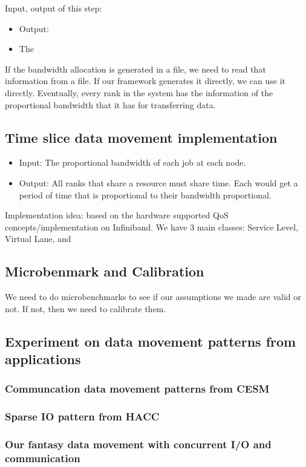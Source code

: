 \documentclass[letter]{article}
\begin{document}
Input, output of this step:
\begin{itemize}
\item Output:
\item The
\end{itemize}

If the bandwidth allocation is generated in a file, we need to read that information from a file. If our framework generates it directly, we can use it directly. Eventually, every rank in the system has the information of the proportional bandwidth that it has for transferring data.

\subsection{Time slice data movement implementation}
\begin{itemize}
\item Input: The proportional bandwidth of each job at each node.
\item Output: All ranks that share a resource must share time. Each would get a period of time that is proportional to their bandwidth proportional.
\end{itemize}

Implementation idea: based on the hardware supported QoS concepts/implementation on Infiniband. We have 3 main classes: Service Level, Virtual Lane, and 

\subsection{Microbenmark and Calibration}

We need to do microbenchmarks to see if our assumptions we made are valid or not. If not, then we need to calibrate them.

\subsection{Experiment on data movement patterns from applications}
\subsubsection{Communcation data movement patterns from CESM}
\subsubsection{Sparse IO pattern from HACC}
\subsubsection{Our fantasy data movement with concurrent I/O and communication}
\end{document}

